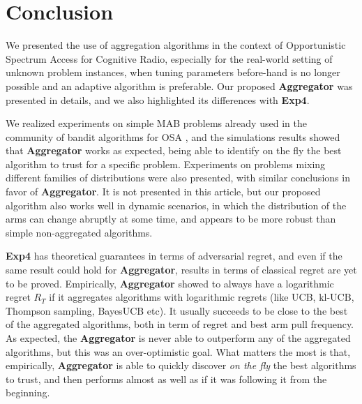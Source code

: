 \documentclass[conference]{IEEEtran}
\theoremstyle{plain}  %
\newcommand{\klUCB}[0]{$\mathrm{kl}$-$\mathrm{UCB}$}
\newcommand{\Aggr}[0]{\textbf{Aggregator}}
\newcommand{\ExpQ}[0]{\textbf{Exp4}}
\begin{document}
\section{Conclusion}\label{sec:conclusion}

We presented the use of aggregation algorithms in the context of Opportunistic Spectrum Access for Cognitive Radio,
especially for the real-world setting of unknown problem instances,
when tuning parameters before-hand is no longer possible and an adaptive algorithm is preferable.
Our proposed \Aggr{} was presented in details,
and we also highlighted its differences with \ExpQ.

We realized experiments on simple MAB problems already used in the community of bandit algorithms for OSA \cite{Jouini10},
and the simulations results showed that \Aggr{} works as expected, being able to identify on the fly the best algorithm to trust for a specific problem.
Experiments on problems mixing different families of distributions were also presented, with similar conclusions in favor of \Aggr.
It is not presented in this article, but our proposed algorithm also works well in dynamic scenarios, in which the distribution of the arms can change abruptly at some time,
and appears to be more robust than simple non-aggregated algorithms.

\ExpQ{} has theoretical guarantees in terms of adversarial regret, and even if the same result could hold for \Aggr, results in terms of classical regret are yet to be proved.
Empirically, \Aggr{} showed to always have a logarithmic
regret $R_T$ if it aggregates algorithms with logarithmic regrets (like UCB, \klUCB, Thompson sampling, BayesUCB etc).
It usually succeeds to be close to the best of the aggregated algorithms, both in term of regret and best arm pull frequency.
As expected, the \Aggr{} is never able to outperform any of the aggregated algorithms, but this was an over-optimistic goal.
%
What matters the most is that, empirically, \Aggr{} is able to quickly discover \emph{on the fly} the best algorithms to trust, and then performs almost as well as if it was following it from the beginning.
\end{document}
